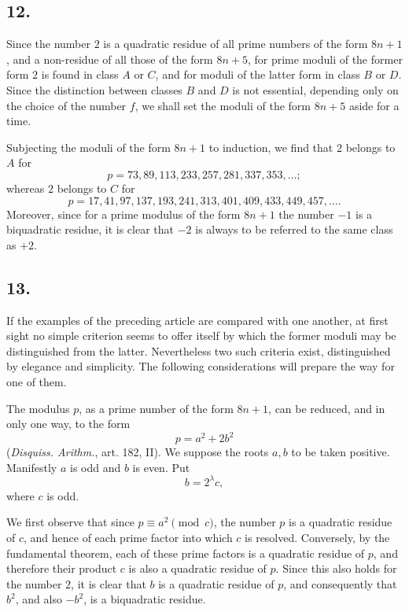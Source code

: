 \documentclass[12pt]{article}
\begin{document}
\subsection*{12.}

Since the number $2$ is a quadratic residue of all prime numbers of the form $8n+1$, and a non-residue of all those of the form $8n+5$, for prime moduli of the former form $2$ is found in class $A$ or $C$, and for moduli of the latter form in class $B$ or $D$. Since the distinction between classes $B$ and $D$ is not essential, depending only on the choice of the number $f$, we shall set the moduli of the form $8n+5$ aside for a time.

Subjecting the moduli of the form $8n+1$ to induction, we find that $2$ belongs to $A$ for
\[
p=73,89,113,233,257,281,337,353,\ldots;
\]
whereas $2$ belongs to $C$ for
\[
p=17,41,97,137,193,241,313,401,409,433,449,457,\ldots.
\]
Moreover, since for a prime modulus of the form $8n+1$ the number $-1$ is a biquadratic residue, it is clear that $-2$ is always to be referred to the same class as $+2$.

\subsection*{13.}

If the examples of the preceding article are compared with one another, at first sight no simple criterion seems to offer itself by which the former moduli may be distinguished from the latter. Nevertheless two such criteria exist, distinguished by elegance and simplicity. The following considerations will prepare the way for one of them.

The modulus $p$, as a prime number of the form $8n+1$, can be reduced, and in only one way, to the form
\[
p=a^2+2b^2
\]
(\emph{Disquiss. Arithm.}, art. 182, II). We suppose the roots $a,b$ to be taken positive. Manifestly $a$ is odd and $b$ is even. Put
\[
b=2^\lambda c,
\]
where $c$ is odd.

We first observe that since $p\equiv a^2\pmod c$, the number $p$ is a quadratic residue of $c$, and hence of each prime factor into which $c$ is resolved. Conversely, by the fundamental theorem, each of these prime factors is a quadratic residue of $p$, and therefore their product $c$ is also a quadratic residue of $p$. Since this also holds for the number $2$, it is clear that $b$ is a quadratic residue of $p$, and consequently that $b^2$, and also $-b^2$, is a biquadratic residue.
\end{document}
